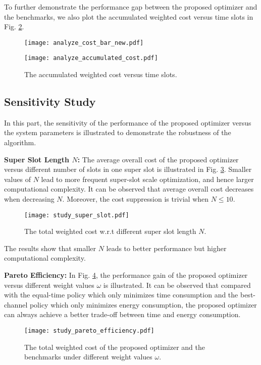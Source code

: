 To further demonstrate the performance gap between the proposed {\fwName} optimizer and the benchmarks, we also plot the accumulated weighted cost versus time slots in Fig. \ref{fig:analyze_accumulated_cost}.


\begin{figure}
    \centering
    \texttt{[image: analyze\_cost\_bar\_new.pdf]}
    \caption{}
    \label{fig:analyze_total_cost}
\end{figure}

  
\begin{figure}
    \centering
    \texttt{[image: analyze\_accumulated\_cost.pdf]}
    \caption{The accumulated weighted cost versus time slots.}
    \label{fig:analyze_accumulated_cost}
\end{figure}


\subsection{Sensitivity Study}
\label{subsec:sensitivity}

In this part, the sensitivity of the performance of the proposed {\fwName} optimizer versus the system parameters is illustrated to demonstrate the robustness of the algorithm.

\noindent\textbf{Super Slot Length $N$:}
The average overall cost of the proposed {\fwName} optimizer versus different number of slots in one super slot is illustrated in Fig. \ref{fig:study_super_slot}. Smaller values of $N$ lead to more frequent super-slot scale optimization, and hence larger computational complexity. It can be observed that average overall cost decreases when decreasing $N$. Moreover, the cost suppression is trivial when $N\leq 10$.
\begin{figure}
    \centering
    \texttt{[image: study\_super\_slot.pdf]}
    \caption{The total weighted cost w.r.t different super slot length $N$.}
    \label{fig:study_super_slot}
\end{figure}
The results show that smaller $N$ leads to better performance but higher computational complexity.

\noindent\textbf{Pareto Efficiency:}
In Fig. \ref{fig:study_pareto_efficiency}, the performance gain of the proposed {\fwName} optimizer versus different weight values $\omega$ is illustrated.
It can be observed that compared with the equal-time policy which only minimizes time consumption and the best-channel policy which only minimizes energy consumption, the proposed {\fwName} optimizer can always achieve a better trade-off between time and energy consumption.
\begin{figure}
    \centering
    \texttt{[image: study\_pareto\_efficiency.pdf]}
    \caption{The total weighted cost of the proposed {\fwName} optimizer and the benchmarks under different weight values $\omega$.}
    \label{fig:study_pareto_efficiency}
\end{figure}
